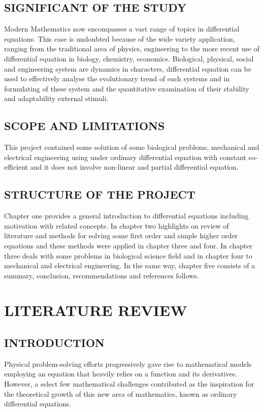 \documentclass[11pt]{report}
\begin{document}
	\section{SIGNIFICANT OF THE STUDY}
	Modern Mathematics now encompasses a vast range of topics in differential equations. This case is undoubted because of the wide variety application, ranging from the traditional area of physics, engineering to the more recent use of differential equation in biology, chemistry, economics. Biological, physical, social and engineering system are dynamics in characters, differential equation can be used to effectively analyse the evolutionary trend of such systems and in formulating of these system and the quantitative examination of their stability and adaptability external stimuli. 
	
	\section{SCOPE AND LIMITATIONS}
	This project contained some solution of some biological problems, mechanical and electrical engineering using under ordinary differential equation with constant co-efficient and it does not involve non-linear and partial differential equation.
	
	\section{STRUCTURE OF THE PROJECT}
	Chapter one provides a general introduction to differential equations including motivation with related concepts. In chapter two highlights on review of literature and methods  for solving some first order and simple higher order equations and these methods were applied in chapter three and four. In chapter three deals with some problems in biological science field and in chapter four to mechanical and electrical engineering. In the same way, chapter five consists of a summary, conclusion, recommendations and references follows.
	
		
	\chapter{LITERATURE REVIEW}
	\section{INTRODUCTION}
	Physical problem-solving efforts progressively gave rise to mathematical models employing an equation that heavily relies on a function and its derivatives. However, a select few mathematical challenges contributed as the inspiration for the theoretical growth of this new area of mathematics, known as ordinary differential equations.\\
	 
\end{document}
